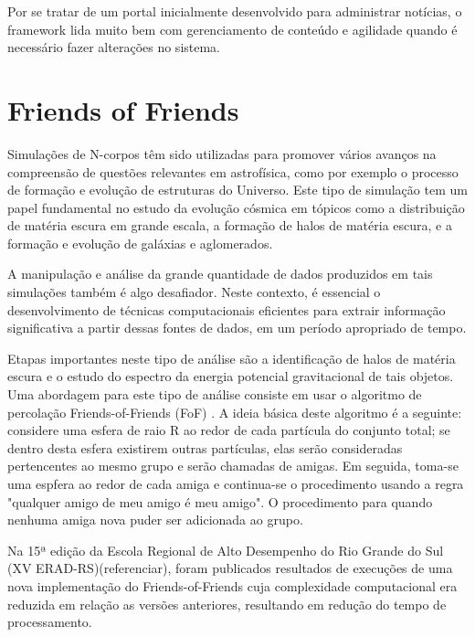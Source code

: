 \documentclass[tg]{mdtufsm}
\begin{document}
Por se tratar de um portal inicialmente desenvolvido para administrar notícias, o framework lida muito  bem com gerenciamento de conteúdo e agilidade quando é necessário fazer alterações no sistema.


\section{Friends of Friends}
Simulações de N-corpos têm sido utilizadas para promover vários avanços na compreensão de questões relevantes em astrofísica, como por exemplo o processo de formação e evolução de estruturas do Universo. Este tipo de simulação tem um papel fundamental\cite{Bertschinger,Efstathiou} no estudo da evolução cósmica em tópicos como a distribuição de matéria escura em grande escala, a formação de halos de matéria escura, e a formação e evolução de galáxias e aglomerados.

A manipulação e análise da grande quantidade de dados produzidos em tais simulações também é algo desafiador.
Neste contexto, é essencial o desenvolvimento de técnicas computacionais eficientes para extrair informação
significativa a partir dessas fontes de dados, em um período apropriado de tempo.

Etapas importantes neste tipo de análise são a identificação de halos de matéria escura e o estudo do espectro da
energia potencial gravitacional de tais objetos. Uma abordagem para este tipo de análise consiste em usar o
algoritmo de percolação Friends-of-Friends (FoF) \cite{uchra} . A ideia básica deste algoritmo é a seguinte: considere uma
esfera de raio R ao redor de cada partícula do conjunto total; se dentro desta esfera existirem outras partículas, elas
serão consideradas pertencentes ao mesmo grupo e serão chamadas de amigas. Em seguida, toma-se uma espfera ao
redor de cada amiga e continua-se o procedimento usando a regra "qualquer amigo de meu amigo é meu amigo". O
procedimento para quando nenhuma amiga nova puder ser adicionada ao grupo.

Na 15ª edição da Escola Regional de Alto Desempenho do Rio Grande do Sul (XV ERAD-RS)(referenciar), foram publicados resultados de execuções de uma nova implementação do Friends-of-Friends\cite{friends} cuja complexidade computacional era reduzida em relação as versões anteriores, resultando em redução do tempo de processamento.


\end{document}
